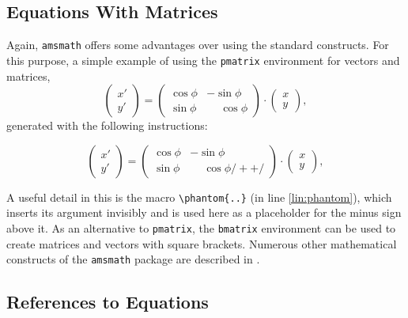 \subsection{Equations With Matrices}

Again, \texttt{amsmath} offers some advantages over using the standard \latex
constructs. For this purpose, a simple example of using the \texttt{pmatrix}
environment for vectors and matrices,
%
\begin{equation}
	\begin{pmatrix}
		x' \\ y'
	\end{pmatrix}
	=
	\begin{pmatrix}
		\cos \phi & -\sin \phi           \\
		\sin \phi & \phantom{-}\cos \phi
	\end{pmatrix}
	\cdot
	\begin{pmatrix}
		x \\ y
	\end{pmatrix} ,
\end{equation}
%
generated with the following instructions:
%
\begin{LaTeXCode}
\begin{equation}
	\begin{pmatrix} 
			x' \\ 
			y' 
	\end{pmatrix}
	= 
	\begin{pmatrix}
		  \cos \phi &          -\sin \phi \\
		  \sin \phi & \phantom{-}\cos \phi /+ \label{lin:phantom} +/
	\end{pmatrix} 
	\cdot
	\begin{pmatrix} 
			x \\ 
			y 
	\end{pmatrix} ,
\end{equation}
\end{LaTeXCode}
%
A useful detail in this is the \tex macro \verb!\phantom{..}! (in line 
\ref{lin:phantom}), which inserts its argument invisibly and is used here
as a placeholder for the minus sign above it.
As an alternative to \texttt{pmatrix}, the \texttt{bmatrix} environment can
be used to create matrices and vectors with square brackets.
Numerous other mathematical constructs of the \texttt{amsmath} package are
described in \cite{Mittelbach2023}.


\subsection{References to Equations}
\label{sec:ReferencesToEquations}

